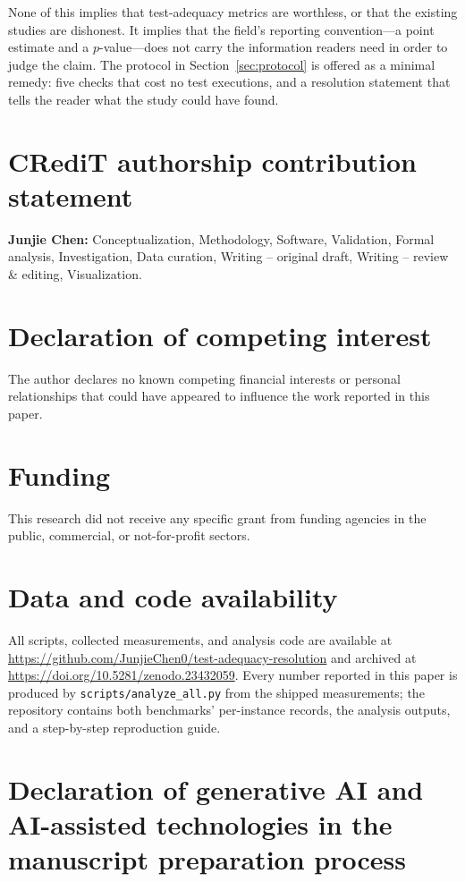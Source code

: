 \documentclass[preprint,12pt]{elsarticle}
\begin{document}
None of this implies that test-adequacy metrics are worthless, or that the
existing studies are dishonest. It implies that the field's reporting
convention---a point estimate and a $p$-value---does not carry the
information readers need in order to judge the claim. The protocol in
Section~\ref{sec:protocol} is offered as a minimal remedy: five checks that
cost no test executions, and a resolution statement that tells the reader
what the study could have found.

\section*{CRediT authorship contribution statement}

\textbf{Junjie Chen:} Conceptualization, Methodology, Software, Validation,
Formal analysis, Investigation, Data curation, Writing -- original draft,
Writing -- review \& editing, Visualization.

\section*{Declaration of competing interest}

The author declares no known competing financial interests or personal
relationships that could have appeared to influence the work reported in this
paper.

\section*{Funding}

This research did not receive any specific grant from funding agencies in the
public, commercial, or not-for-profit sectors.

\section*{Data and code availability}

All scripts, collected measurements, and analysis code are available at
\url{https://github.com/JunjieChen0/test-adequacy-resolution} and archived at
\url{https://doi.org/10.5281/zenodo.23432059}.
Every number reported in this paper is produced by
\texttt{scripts/analyze\_all.py} from the shipped measurements; the
repository contains both benchmarks' per-instance records, the analysis
outputs, and a step-by-step reproduction guide.

\section*{Declaration of generative AI and AI-assisted technologies in the manuscript preparation process}
\end{document}
